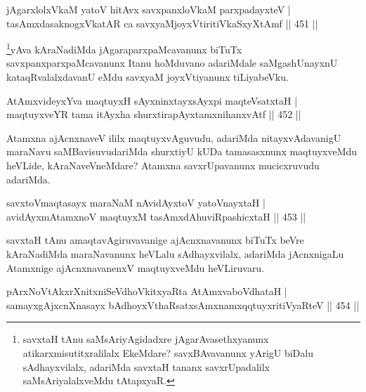 \begin{shl}
jAgarxlolxVkaM yatoV hitAvx savxpanxloVkaM parxpadayxteV | \\
tasAmxdasaknogxV\s katAR ca savxyaMjoyxVtiritiVkaSxyXtAmf \hfill||  451 ||  
\end{shl}

\begin{artha}
\footnote{savxtaH tAnu saMsAriyAgidadxre jAgarAvasethxyanunx atikarxmisutitxralilalx EkeMdare? savxBAvavanunx yArigU biDalu sAdhayxvilalx, adariMda savxtaH tananx savxrUpadalilx saMsAriyalalxveMdu tAtapxyaR.}yAva kAraNadiMda jAgaraparxpaMcavanunx biTuTx savxpanxparxpaMcavanunx Itanu hoMduvano adariMdale saMgashUnayxnU kataqRvalalxdavanU eMdu savxyaM joyxVtiyanunx tiLiyabeVku.
\end{artha}


\begin{shl}
AtAmxvideyxYva maqtuyxH sAyxninxtayxsAyxpi maqteVsatxtaH | \\
maqtuyxveYR tama itAyxha shurxtirapAyxtamxnihanxvAtf \hfill||  452 || 
\end{shl}

\begin{artha}
Atamxna ajAcnxnaveV ililx maqtuyxvAguvudu, adariMda nitayxvAdavanigU maraNavu saMBavisuvudariMda shurxtiyU kUDa tamasasxnunx maqtuyxveMdu heVLide, kAraNaveVneMdare? Atamxna savxrUpavanunx mucicxruvudu adariMda.
\end{artha}

\begin{shl}
savxtoVmaqtasayx maraNaM nAvidAyxtoV yatoV\s nayxtaH | \\
avidAyxmAtamxnoV maqtuyxM tasAmxdAhuviRpashicxtaH \hfill||  453 ||  
\end{shl}

\begin{artha}
savxtaH tAnu amaqtavAgiruvavanige ajAcnxnavanunx biTuTx beVre kAraNadiMda maraNavanunx heVLalu sAdhayxvilalx, adariMda jAcnxnigaLu Atamxnige ajAcnxnavanenxV maqtuyxveMdu heVLiruvaru.
\end{artha}


\begin{shl}
pArxNoVtAkxrXnitxniSeVdhoVkitxyaRta AtAmxvaboVdhataH | \\
samayxgAjxcnXnasayx bAdhoyxV\s thaRsatxsAmxnamxqqtuyxritiVyaRteV \hfill||  454 ||  
\end{shl}

